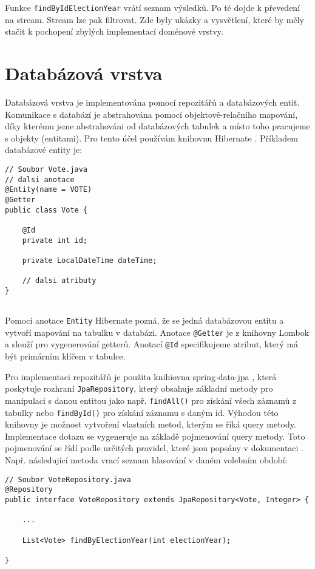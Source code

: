 \noindent Funkce \lstinline|findByIdElectionYear| vrátí seznam výsledků. Po té dojde k převedení na stream. Stream lze pak filtrovat. Zde byly ukázky a vysvětlení, které by měly stačit k pochopení zbylých implementací doménové vrstvy.

\section {Databázová vrstva}
Databázová vrstva je implementována pomocí repozitářů a databázových entit. Komunikace \linebreak s databází je abstrahována pomocí objektově-relačního mapování, díky kterému jsme abstrahováni od databázových tabulek a místo toho pracujeme s objekty (entitami). Pro tento účel používám knihovnu Hibernate \cite{hibernate}. Příkladem databázové entity je:

\begin{lstlisting}[caption={Entita Vote reprezentující hlasování}, label={lst:vote-entity}, tabsize=2]
// Soubor Vote.java
// dalsi anotace
@Entity(name = VOTE)
@Getter
public class Vote {
	
	@Id
	private int id;
	
	private LocalDateTime dateTime;
	
	// dalsi atributy
}
	
\end{lstlisting}

\noindent Pomocí anotace \lstinline|Entity| Hibernate pozná, že se jedná databázovou entitu a vytvoří mapování na tabulku v databázi. Anotace \lstinline|@Getter| je z knihovny Lombok a slouží pro vygenerování getterů. Anotací \lstinline|@Id| specifikujeme atribut, který má být primárním klíčem v tabulce. 

Pro implementaci repozitářů je použita knihiovna spring-data-jpa \cite{spring-jpa}, která poskytuje rozhraní \lstinline|JpaRepository|, který obsahuje základní metody pro manipulaci s danou entitou jako \linebreak např. \lstinline|findAll()| pro získání všech záznamů z tabulky nebo \lstinline|findById()| pro získání záznamu s daným id. Výhodou této knihovny je možnost vytvoření vlastních metod, kterým se říká query metody. Implementace dotazu se vygeneruje na základě pojmenování query metody. Toto pojmenování se řídí podle určitých pravidel, které jsou popsány v dokumentaci \cite{spring-jpa}. Např. následující metoda vrací seznam hlasování v daném volebním období:

\begin{lstlisting}[caption={Repozitář pro hlasování}, label={lst:be-repository-vote}, tabsize=2]
// Soubor VoteRepository.java
@Repository
public interface VoteRepository extends JpaRepository<Vote, Integer> {
	
	...
	
	List<Vote> findByElectionYear(int electionYear);
	
}
\end{lstlisting}

